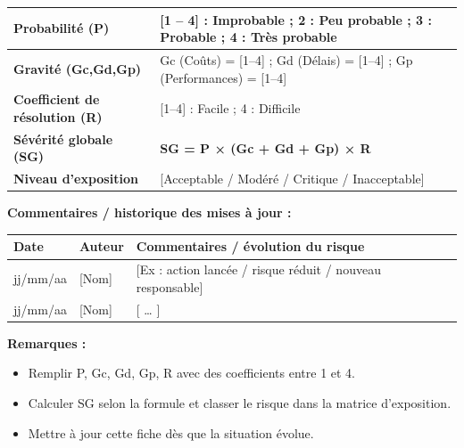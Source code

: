 \begin{tabular}{|p{5.2cm}|p{10.8cm}|}
\textbf{Probabilité (P)} & \textbf{[1 -- 4]} \quad 1 : Improbable ; 2 : Peu probable ; 3 : Probable ; 4 : Très probable \\ \hline

\textbf{Gravité (Gc,Gd,Gp)} & Gc (Coûts) = [1–4] ; Gd (Délais) = [1–4] ; Gp (Performances) = [1–4] \\ \hline

\textbf{Coefficient de résolution (R)} & [1–4] \quad 1 : Facile ; 4 : Difficile \\ \hline

\textbf{Sévérité globale (SG)} & \textbf{SG = P × (Gc + Gd + Gp) × R} \\ \hline

\textbf{Niveau d'exposition} & [Acceptable / Modéré / Critique / Inacceptable] \\ \hline
\end{tabular}
\endgroup

\vspace{12pt}

\noindent\textbf{Commentaires / historique des mises à jour :}\\[4pt]
\begingroup
\renewcommand{\arraystretch}{1.2}
\begin{tabular}{|p{3.5cm}|p{3.5cm}|p{8.5cm}|}
\hline
\rowcolor{gray!20}\textbf{Date} & \textbf{Auteur} & \textbf{Commentaires / évolution du risque} \\ \hline
jj/mm/aa & [Nom] & [Ex : action lancée / risque réduit / nouveau responsable] \\ \hline
jj/mm/aa & [Nom] & [ … ] \\ \hline
\end{tabular}
\endgroup

\vspace{10pt}

\noindent\textbf{Remarques :}
\begin{itemize}
  \item Remplir P, Gc, Gd, Gp, R avec des coefficients entre 1 et 4.
  \item Calculer SG selon la formule et classer le risque dans la matrice d’exposition.
  \item Mettre à jour cette fiche dès que la situation évolue.
\end{itemize}

